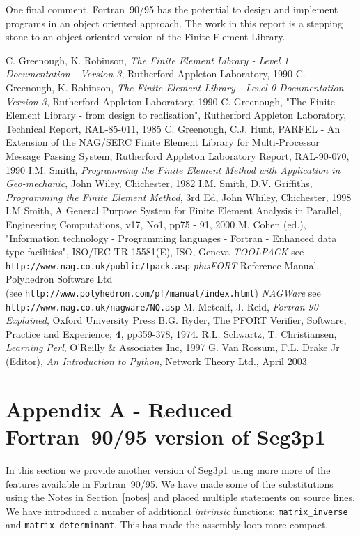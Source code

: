 \documentclass[a4paper,titlepage,11pt]{article}
\begin{document}
One final comment. Fortran~90/95 has the potential to design and implement
programs in an object oriented approach. The work in this report is a
stepping stone to an object oriented version of the Finite Element Library.

\begin{thebibliography}{99}
 C. Greenough, K. Robinson, {\it The Finite Element Library - Level 1
Documentation - Version 3}, Rutherford Appleton Laboratory, 1990
 C. Greenough, K. Robinson, {\it The Finite Element Library - Level 0 
Documentation - Version 3}, Rutherford Appleton Laboratory, 1990
 C. Greenough, "The Finite Element Library - from design to realisation",
Rutherford Appleton Laboratory, Technical Report, RAL-85-011, 1985
 C. Greenough, C.J. Hunt, PARFEL - An Extension of the NAG/SERC Finite Element
Library for Multi-Processor Message Passing System, Rutherford Appleton Laboratory Report, 
RAL-90-070, 1990
 I.M. Smith, {\it Programming the Finite Element Method with Application in
Geo-mechanic}, John Wiley, Chichester, 1982
 I.M. Smith, D.V. Griffiths, {\it Programming the Finite Element Method}, 3rd Ed, John Whiley, Chichester, 1998
 I.M Smith, A General Purpose System for Finite Element Analysis in Parallel, Engineering Computations, v17, No1, pp75 - 91, 2000
 M. Cohen (ed.), "Information technology - Programming languages - Fortran -
Enhanced data type facilities", ISO/IEC TR 15581(E), ISO, Geneva
 \textit{TOOLPACK} see {\tt http://www.nag.co.uk/public/tpack.asp}
 \textit{plusFORT} Reference Manual, Polyhedron Software Ltd\\ (see  {\tt http://www.polyhedron.com/pf/manual/index.html})
\textit{NAGWare} see {\tt http://www.nag.co.uk/nagware/NQ.asp}
 M. Metcalf, J. Reid, {\it Fortran 90 Explained}, Oxford University Press
 B.G. Ryder, The PFORT Verifier, Software, Practice and Experience, {\bf 4}, pp359-378, 1974.
 R.L. Schwartz, T. Christiansen, {\it Learning Perl}, O'Reilly \& Associates Inc, 1997
 G. Van Rossum, F.L. Drake Jr (Editor), {\it An Introduction to Python}, Network Theory Ltd., April 2003
\end{thebibliography}
\newpage
\appendix
{}
\section*{Appendix A - Reduced Fortran~90/95 version of Seg3p1}
In this section we provide another version of Seg3p1 using more more of the features 
available in Fortran~90/95. We have made some of the substitutions using
the Notes in Section~\ref{notes} and placed multiple statements on
source lines. We have introduced a number of additional {\it intrinsic} functions: 
{\tt matrix\_inverse} and {\tt matrix\_determinant}. This has made the assembly
loop more compact.
\end{document}
